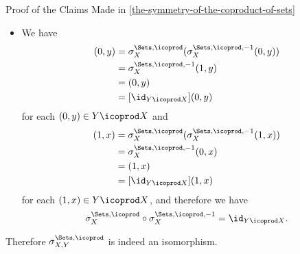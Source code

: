 \begin{Proof}{Proof of the Claims Made in \cref{the-symmetry-of-the-coproduct-of-sets}}
\begin{itemize}
\begin{align*}
                                                                                          &= \sigma^{\Sets,\icoprod,-1}_{X}(0,y)\\
                                                                                          &= (1,y)\\
                                                                                          &= [\id_{X\icoprod Y}](1,y)
            \end{align*}
            for each $(1,y)\in X\icoprod Y$, and therefore we have
            \[
                \sigma^{\Sets,\icoprod,-1}_{X,Y}%
                \circ%
                \sigma^{\Sets,\icoprod}_{X,Y}%
                =%
                \id_{X\icoprod Y}.%
            \]%
        \item{}We have
            \begin{align*}
                [\sigma^{\Sets,\icoprod}_{X,Y}\circ\sigma^{\Sets,\icoprod,-1}_{X,Y}](0,y) &= \sigma^{\Sets,\icoprod}_{X}(\sigma^{\Sets,\icoprod,-1}_{X}(0,y))\\
                                                                                          &= \sigma^{\Sets,\icoprod,-1}_{X}(1,y)\\
                                                                                          &= (0,y)\\
                                                                                          &= [\id_{Y\icoprod X}](0,y)
            \end{align*}
            for each $(0,y)\in Y\icoprod X$ and
            \begin{align*}
                [\sigma^{\Sets,\icoprod}_{X,Y}\circ\sigma^{\Sets,\icoprod,-1}_{X,Y}](1,x) &= \sigma^{\Sets,\icoprod}_{X}(\sigma^{\Sets,\icoprod,-1}_{X}(1,x))\\
                                                                                          &= \sigma^{\Sets,\icoprod,-1}_{X}(0,x)\\
                                                                                          &= (1,x)\\
                                                                                          &= [\id_{Y\icoprod X}](1,x)
            \end{align*}
            for each $(1,x)\in Y\icoprod X$, and therefore we have
            \[
                \sigma^{\Sets,\icoprod}_{X}%
                \circ%
                \sigma^{\Sets,\icoprod,-1}_{X}%
                =%
                \id_{Y\icoprod X}.%
            \]%
    \end{itemize}
    Therefore $\sigma^{\Sets,\icoprod}_{X,Y}$ is indeed an isomorphism.


\end{Proof}
